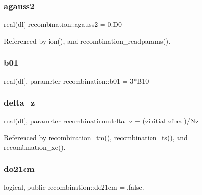 \subsubsection{\texorpdfstring{agauss2}{agauss2}}
{\footnotesize\ttfamily real(dl) recombination\+::agauss2 = 0.\+D0\hspace{0.3cm}{\ttfamily [private]}}



Referenced by ion(), and recombination\+\_\+readparams().

\mbox{\label{namespacerecombination_ac87df6d66d9a2c678cf5712166b0307a}} 
\subsubsection{\texorpdfstring{b01}{b01}}
{\footnotesize\ttfamily real(dl), parameter recombination\+::b01 = 3$\ast$B10\hspace{0.3cm}{\ttfamily [private]}}

\mbox{\label{namespacerecombination_a7f3dac9960d3b472a93e5cf800eb1538}} 
\subsubsection{\texorpdfstring{delta\+\_\+z}{delta\_z}}
{\footnotesize\ttfamily real(dl), parameter recombination\+::delta\+\_\+z = (\mbox{\hyperlink{namespacerecombination_a59aa3ea34247a93b4f4c11b5ca93c97c}{zinitial}}-\/\mbox{\hyperlink{namespacerecombination_a6c83801bcb6009615d1c1103da95f91f}{zfinal}})/Nz\hspace{0.3cm}{\ttfamily [private]}}



Referenced by recombination\+\_\+tm(), recombination\+\_\+ts(), and recombination\+\_\+xe().

\mbox{\label{namespacerecombination_a7789f3edc0804a55e6ad9e9ad4450848}} 
\subsubsection{\texorpdfstring{do21cm}{do21cm}}
{\footnotesize\ttfamily logical, public recombination\+::do21cm = .false.}



